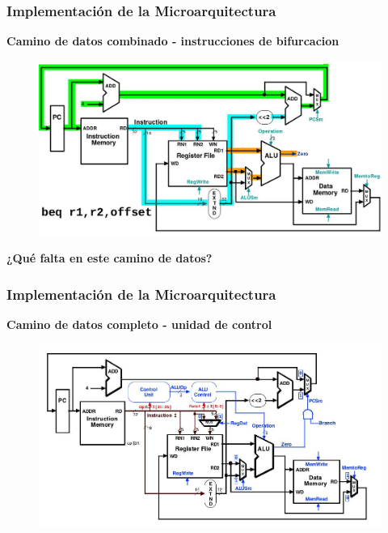 \documentclass[aspectratio=169,compress]{beamer}
\begin{document}
\begin{footnotesize}
\begin{frame}
\frametitle{Implementación de la Microarquitectura}
\begin{center}\textbf{Camino de datos combinado - instrucciones de bifurcacion}\end{center}
\begin{figure}
\includegraphics[scale=0.3]{images/beq.jpg} 
\end{figure}
\begin{center}
\textbf{¿Qué falta en este camino de datos?}
\end{center}
\end{frame}


\begin{frame}
\frametitle{Implementación de la Microarquitectura}
\begin{center}\textbf{Camino de datos completo - unidad de control}\end{center}
\begin{figure}
\includegraphics[scale=0.3]{images/cpu-completa.jpg} 
\end{figure}

\end{frame}


\end{footnotesize}
\end{document}
